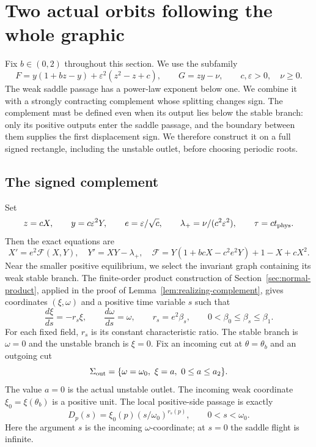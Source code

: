 \section{Two actual orbits following the whole graphic}
\label{sec:lower-main}
Fix $b\in(0,2)$ throughout this section. We use the subfamily
\begin{equation}\label{eq:lower-realizing-family}
 F=y(1+bz-y)+\varepsilon^2(z^2-z+c),\qquad
 G=zy-\nu,\qquad c,\varepsilon>0,\quad \nu\ge0 .
\end{equation}
The weak saddle passage has a power-law exponent below one. We
combine it with a strongly contracting complement whose splitting
changes sign. The complement must be defined even when its output
lies below the stable branch: only its positive outputs enter the
saddle passage, and the boundary between them supplies the first
displacement sign. We therefore construct it on a full signed
rectangle, including the unstable outlet, before choosing periodic
roots.

\subsection{The signed complement}
Set
\[
 z=cX,\qquad y=c\varepsilon^2Y,\qquad
 e=\varepsilon/\sqrt c,\qquad
 \lambda_+=\nu/(c^2\varepsilon^2),\qquad
 \tau=ct_{\rm phys}.
\]
Then the exact equations are
\begin{equation}\label{eq:lower-realizing-scaled}
 X'=e^2\mathcal F(X,Y),\quad Y'=XY-\lambda_+,\quad
 \mathcal F=Y(1+bcX-c^2e^2Y)+1-X+cX^2 .
\end{equation}
Near the smaller positive equilibrium, we select the invariant graph
containing its weak stable branch. The finite-order product construction
of Section~\ref{sec:normal-product}, applied in the proof of
Lemma~\ref{lem:realizing-complement}, gives coordinates $(\xi,\omega)$
and a positive time variable $s$ such that
\begin{equation}\label{eq:lower-exact-power-main}
 \frac{d\xi}{ds}=-r_s\xi,\qquad
 \frac{d\omega}{ds}=\omega,\qquad
 r_s=e^2\beta_s,\qquad 0<\beta_0\le\beta_s\le\beta_1 .
\end{equation}
For each fixed field, $r_s$ is its constant characteristic ratio.
The stable branch is $\omega=0$ and the unstable branch
is $\xi=0$. Fix an incoming cut at $\theta=\theta_b$ and an outgoing
cut
\[
 \Sigma_{\rm out}=\{\omega=\omega_0,\ \xi=a,\ 0\le a\le a_2\}.
\]
The value $a=0$ is the actual unstable outlet. The incoming weak
coordinate $\xi_0=\xi(\theta_b)$ is a positive unit. The local
positive-side passage is exactly
\begin{equation}\label{eq:lower-power-main}
 D_p(s)=\xi_0(p)(s/\omega_0)^{r_s(p)},\qquad 0<s<\omega_0 .
\end{equation}
Here the argument $s$ is the incoming $\omega$-coordinate; at $s=0$
the saddle flight is infinite.

